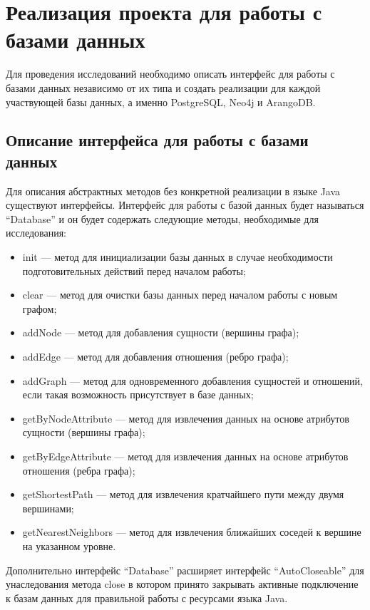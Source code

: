 \chapter{Реализация проекта для работы с базами данных}

Для проведения исследований необходимо описать интерфейс для работы с базами данных независимо от их типа и создать реализации для каждой
участвующей базы данных, а именно PostgreSQL, Neo4j и ArangoDB.


\section{Описание интерфейса для работы с базами данных}

Для описания абстрактных методов без конкретной реализации в языке Java существуют интерфейсы. Интерфейс для работы с базой данных будет
называться “Database” и он будет содержать следующие методы, необходимые для исследования:

\begin{itemize}
    \item init — метод для инициализации базы данных в случае необходимости подготовительных действий перед началом работы;
    \item clear — метод для очистки базы данных перед началом работы с новым графом;
    \item addNode — метод для добавления сущности (вершины графа);
    \item addEdge — метод для добавления отношения (ребро графа);
    \item addGraph — метод для одновременного добавления сущностей и отношений, если такая возможность присутствует в базе данных;
    \item getByNodeAttribute — метод для извлечения данных на основе атрибутов сущности (вершины графа);
    \item getByEdgeAttribute — метод для извлечения данных на основе атрибутов отношения (ребра графа);
    \item getShortestPath — метод для извлечения кратчайшего пути между двумя вершинами;
    \item getNearestNeighbors — метод для извлечения ближайших соседей к вершине на указанном уровне.
\end{itemize}

Дополнительно интерфейс “Database” расширяет интерфейс “AutoCloseable” для унаследования метода close в котором принято закрывать активные
подключение к базам данных для правильной работы с ресурсами языка Java.


